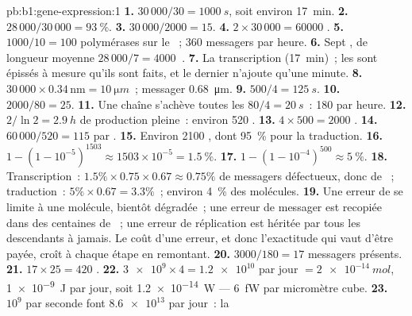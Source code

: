 \begin{solution}{pb:b1:gene-expression:1}
\textbf{1.} $30\,000/30 = \qty{1000}{s}$, soit environ \qty{17}{min}.
\textbf{2.} $28\,000/30\,000 = \qty{93}{\%}$.
\textbf{3.} $30\,000/2000 = 15$.
\textbf{4.} $2\times 30\,000 = \num{60000}$ .
\textbf{5.} $1000/10 = 100$ polymérases sur le ~; 360 messagers par
heure.
\textbf{6.} Sept , de longueur moyenne $28\,000/7 = \qty{4000}{}$
.
\textbf{7.} La transcription (\qty{17}{min})~; les  sont épissés
à mesure qu'ils sont faits, et le dernier n'ajoute qu'une minute.
\textbf{8.}  $30\,000\times 0.34\,\mathrm{nm} = \qty{10}{\micro m}$~; messager \qty{0.68}{\micro m}.
\textbf{9.} $500/4 = \qty{125}{s}$.
\textbf{10.} $2000/80 = 25$.
\textbf{11.} Une chaîne s'achève toutes les $80/4 = \qty{20}{s}$~: 180
par heure.
\textbf{12.} $2/\ln 2 = \qty{2.9}{h}$ de production pleine~: environ 520
.
\textbf{13.} $4\times 500 = 2000$ .
\textbf{14.} $60\,000/520 = 115$  par .
\textbf{15.} Environ 2100 , dont \qty{95}{\%} pour la traduction.
\textbf{16.} $1 - (1 - 10^{-5})^{1503} \approx 1503\times 10^{-5} =
\qty{1.5}{\%}$.
\textbf{17.} $1 - (1 - 10^{-4})^{500} \approx \qty{5}{\%}$.
\textbf{18.} Transcription~: $1.5\%\times 0.75\times 0.67 \approx
0.75\%$ de messagers défectueux, donc de ~; traduction~:
$5\%\times 0.67 = 3.3\%$~; environ \qty{4}{\%} des molécules.
\textbf{19.} Une erreur de  se limite à une molécule, bientôt
dégradée~; une erreur de messager est recopiée dans des centaines de
~; une erreur de réplication est héritée par tous les
descendants à jamais. Le coût d'une erreur, et donc l'exactitude qui
vaut d'être payée, croît à chaque étape en remontant.
\textbf{20.} $3000/180 = 17$ messagers présents.
\textbf{21.} $17\times 25 = 420$ .
\textbf{22.} $\num{3e9}\times 4 = \num{1.2e10}$  par jour
$= \qty{2e-14}{mol}$, \qty{1e-9}{J} par jour, soit \qty{1.2e-14}{W}
--- \qty{6}{fW} par micromètre cube.
\textbf{23.} $10^9$  par seconde font $\num{8.6e13}$ par jour~: la

\end{solution}
